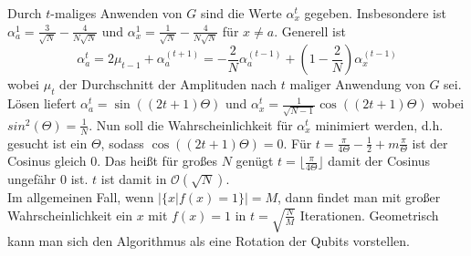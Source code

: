 \documentclass[a4paper, 12pt]{article}
\theoremstyle{plain}
\theoremstyle{definition}
\theoremstyle{lemma}
\theoremstyle{remark}
\theoremstyle{example}
\begin{document}
	Durch $t$-maliges Anwenden von $G$ sind die Werte $\alpha_x^t$ gegeben. Insbesondere ist $\alpha_a^1 = \frac{3}{\sqrt{N}} -\frac{4}{N\sqrt{N}}$ und $\alpha_x^1 = \frac{1}{\sqrt{N}} -\frac{4}{N\sqrt{N}}$ für $x\neq a$. Generell ist \[\alpha_a^t = 2\mu_{t-1} + \alpha_a^{(t+1)} = -\frac{2}{N} \alpha_a^{(t-1)} + \left(1-\frac{2}{N}\right)\alpha_x^{(t-1)}\] wobei $\mu_t$ der Durchschnitt der Amplituden nach $t$ maliger Anwendung von $G$ sei. Lösen liefert $\alpha_a^t = \sin((2t+1)\Theta)$ und $\alpha_x^t = \frac{1}{\sqrt{N-1}}\cos((2t+1)\Theta)$ wobei $sin^2(\Theta) = \frac{1}{N}$. Nun soll die Wahrscheinlichkeit für $\alpha_x^t$ minimiert werden, d.h. gesucht ist ein $\Theta$, sodass $\cos((2t+1)\Theta) = 0$. Für $t = \frac{\pi}{4\Theta} - \frac{1}{2} + m\frac{\pi}{\Theta}$ ist der Cosinus gleich 0. Das heißt für großes $N$ genügt $t = \lfloor \frac{\pi}{4\Theta}\rfloor$ damit der Cosinus ungefähr 0 ist. $t$ ist damit in $\mathcal{O}(\sqrt{N})$.\\
	Im allgemeinen Fall, wenn $\left|\{x | f(x) = 1\}\right| = M$, dann findet man mit großer Wahrscheinlichkeit ein $x$ mit $f(x) = 1$ in $t = \sqrt{\frac{N}{M}}$ Iterationen. Geometrisch kann man sich den Algorithmus als eine Rotation der Qubits vorstellen.
\end{document}
